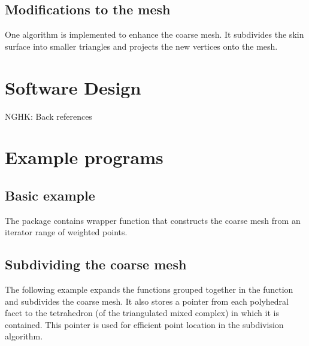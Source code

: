\subsection{Modifications to the mesh}
One algorithm is implemented to enhance the coarse mesh. It subdivides
the skin surface into smaller triangles and projects the new vertices
onto the mesh.
\section{Software Design}
NGHK: Back references
\section{Example programs}
\subsection{Basic example}
The package contains wrapper function that constructs the coarse mesh
from an iterator range of weighted points.

\subsection{Subdividing the coarse mesh}
The following example expands the functions grouped together in the
function  and subdivides the coarse mesh. It also
stores a pointer from each polyhedral facet to the tetrahedron (of the
triangulated mixed complex) in which it is contained. This pointer is
used for efficient point location in the subdivision algorithm.




